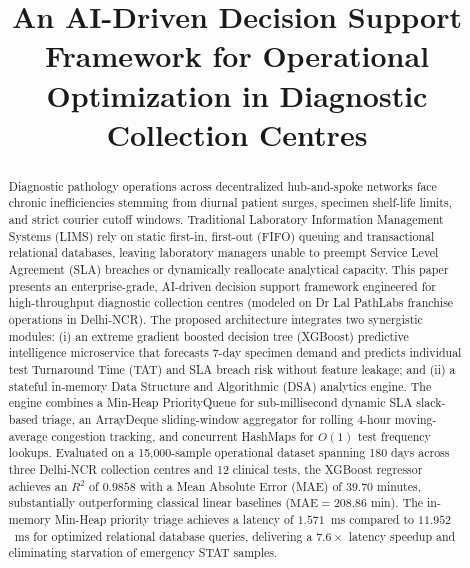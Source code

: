 \documentclass[conference]{IEEEtran}
\begin{document}
\title{An AI-Driven Decision Support Framework for Operational Optimization in Diagnostic Collection Centres}

\author{
}

\maketitle

\begin{abstract}
Diagnostic pathology operations across decentralized hub-and-spoke networks face chronic inefficiencies stemming from diurnal patient surges, specimen shelf-life limits, and strict courier cutoff windows. Traditional Laboratory Information Management Systems (LIMS) rely on static first-in, first-out (FIFO) queuing and transactional relational databases, leaving laboratory managers unable to preempt Service Level Agreement (SLA) breaches or dynamically reallocate analytical capacity. This paper presents an enterprise-grade, AI-driven decision support framework engineered for high-throughput diagnostic collection centres (modeled on Dr Lal PathLabs franchise operations in Delhi-NCR). The proposed architecture integrates two synergistic modules: (i) an extreme gradient boosted decision tree (XGBoost) predictive intelligence microservice that forecasts 7-day specimen demand and predicts individual test Turnaround Time (TAT) and SLA breach risk without feature leakage; and (ii) a stateful in-memory Data Structure and Algorithmic (DSA) analytics engine. The engine combines a Min-Heap PriorityQueue for sub-millisecond dynamic SLA slack-based triage, an ArrayDeque sliding-window aggregator for rolling 4-hour moving-average congestion tracking, and concurrent HashMaps for $O(1)$ test frequency lookups. Evaluated on a 15,000-sample operational dataset spanning 180 days across three Delhi-NCR collection centres and 12 clinical tests, the XGBoost regressor achieves an $R^2$ of $0.9858$ with a Mean Absolute Error (MAE) of $39.70$ minutes, substantially outperforming classical linear baselines ($\text{MAE} = 208.86$ min). The in-memory Min-Heap priority triage achieves a latency of $1.571$~ms compared to $11.952$~ms for optimized relational database queries, delivering a $7.6\times$ latency speedup and eliminating starvation of emergency STAT samples.
\end{abstract}
\end{document}
